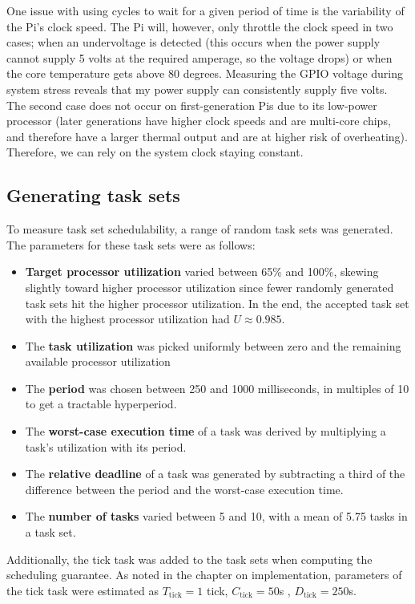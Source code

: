 One issue with using cycles to wait for a given period of time is the variability of the Pi's clock speed. The Pi will, however, only throttle the clock speed in two cases; when an undervoltage is detected (this occurs when the power supply cannot supply 5 volts at the required amperage, so the voltage drops) or when the core temperature gets above 80 degrees\cite{rpi:gpuclockpower}. Measuring the GPIO voltage during system stress reveals that my power supply can consistently supply five volts. The second case does not occur on first-generation Pis due to its low-power processor (later generations have higher clock speeds and are multi-core chips, and therefore have a larger thermal output and are at higher risk of overheating). Therefore, we can rely on the system clock staying constant.

\subsection{Generating task sets}
To measure task set schedulability, a range of random task sets was generated. The parameters for these task sets were as follows:

\begin{itemize}
    \item \textbf{Target processor utilization} varied between 65\% and 100\%, skewing slightly toward higher processor utilization since fewer randomly generated task sets hit the higher processor utilization. In the end, the accepted task set with the highest processor utilization had $U \approx 0.985$.
    \item The \textbf{task utilization} was picked uniformly between zero and the remaining available processor utilization
    \item The \textbf{period} was chosen between 250 and 1000 milliseconds, in multiples of 10 to get a tractable hyperperiod.
    \item The \textbf{worst-case execution time} of a task was derived by multiplying a task's utilization with its period.
    \item The \textbf{relative deadline} of a task was generated by subtracting a third of the difference between the period and the worst-case execution time.
    \item The \textbf{number of tasks} varied between 5 and 10, with a mean of 5.75 tasks in a task set.
\end{itemize}

\noindent Additionally, the \ucos tick task was added to the task sets when computing the scheduling guarantee. As noted in the chapter on implementation, parameters of the tick task were estimated as $T_{\text{tick}} = 1$ tick, $C_\text{tick} = 50$\textmu s , $D_\text{tick} = 250$\textmu s.

